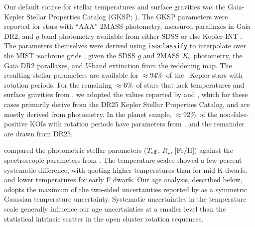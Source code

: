 \documentclass[11pt,twocolumn,tighten]{aastex63}
\newcommand{\fracstarswithprotwithbtwenty}{{$\approx$94\%}}
\newcommand{\fracstarswithprotwithoutbtwenty}{{$\approx$6\%}}
\newcommand{\frackoisnofpwithprotwithbtwenty}{{$\approx$92\%}}
\begin{document}
Our default source for stellar temperatures and surface gravities was
the Gaia-Kepler Stellar Properties Catalog (GKSP;
\citealt{Berger_2020a_catalog}).  The GKSP parameters were reported
for stars with ``AAA'' 2MASS photometry, measured parallaxes in Gaia
DR2,  and $g$-band photometry available from either SDSS or else Kepler-INT
\citep{2012AJ....144...24G}.  The parameters themselves were derived using
\texttt{isoclassify} \citep{2017ApJ...844..102H} to interpolate over
the MIST isochrone grids \citep{Choi_2016,2016ApJS..222....8D}, given
the SDSS $g$ and 2MASS $K_{\rm s}$ photometry, the Gaia DR2
parallaxes, and $V$-band extinction from the
\citet{2019ApJ...887...93G} reddening map.  The resulting stellar
parameters are available for \fracstarswithprotwithbtwenty\ of the
\nuniqstarsantosrot\ Kepler stars with rotation periods.  For the
remaining \fracstarswithprotwithoutbtwenty\ of stars that lack
temperatures and surface gravities from
, we adopted the values reported by
\citet{Santos_2019} and \citet{Santos_2021}, which for these cases
primarily derive from the \citet{Mathur_2017} DR25 Kepler Stellar
Properties Catalog, and are mostly derived from photometry.  In the
planet sample, \frackoisnofpwithprotwithbtwenty\ of the
non-false-positive KOIs with rotation periods have parameters from
\citet{Berger_2020a_catalog}, and the remainder are drawn
from DR25. 

\citet{David_2021} compared the photometric
 stellar parameters ($T_{\rm eff}$,
$R_\star$, [Fe/H]) against the spectroscopic parameters from
\citet{Fulton_2018}.  The temperature scales showed a few-percent
systematic difference, with  quoting higher
temperatures than  for mid K dwarfs,
and lower temperatures for early F dwarfs.  Our age analysis,
described below, adopts the maximum of the two-sided
uncertainties reported by  as a
symmetric Gaussian temperature uncertainty.  Systematic
uncertainties in the temperature scale generally influence 
our age uncertainties at a
smaller level than the statistical intrinsic scatter in the
open cluster rotation sequences.
\end{document}
